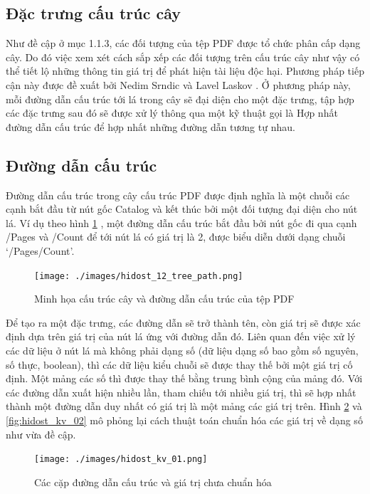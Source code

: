 \documentclass[./../main.tex]{subfiles}
\begin{document}
\subsection{Đặc trưng cấu trúc cây}
Như đề cập ở mục 1.1.3, các đối tượng của tệp PDF được tổ chức phân cấp dạng cây. Do đó việc xem xét cách sắp xếp các đối tượng trên cấu trúc cây như vậy có thể tiết lộ những thông tin giá trị để phát hiện tài liệu độc hại. Phương pháp tiếp cận này được đề xuất bởi Nedim Srndic và Lavel Laskov \cite{hidost}. Ở phương pháp này, mỗi đường dẫn cấu trúc tới lá trong cây sẽ đại diện cho một đặc trưng, tập hợp các đặc trưng sau đó sẽ được xử lý thông qua một kỹ thuật gọi là Hợp nhất đường dẫn cấu trúc để hợp nhất những đường dẫn tương tự nhau.

\subsection*{Đường dẫn cấu trúc}

Đường dẫn cấu trúc trong cây cấu trúc PDF được định nghĩa là một chuỗi các cạnh bắt đầu từ nút gốc Catalog và kết thúc bởi một đối tượng đại diện cho nút lá. Ví dụ theo hình \ref{fig:hidost_12_tree_path} , một đường dẫn cấu trúc bắt đầu bởi nút gốc đi qua cạnh /Pages và /Count để tới nút lá có giá trị là 2, được biểu diễn dưới dạng chuỗi ‘\slash Pages\slash Count’.

\begin{figure}[H]
	\centering
	\texttt{[image: ./images/hidost\_12\_tree\_path.png]}
	\caption{Minh họa cấu trúc cây và đường dẫn cấu trúc của tệp PDF \cite{hidost}}
	\label{fig:hidost_12_tree_path}
\end{figure}

Để tạo ra một đặc trưng, các đường dẫn sẽ trở thành tên, còn giá trị sẽ được xác định dựa trên giá trị của nút lá ứng với đường dẫn đó. Liên quan đến việc xử lý các dữ liệu ở nút lá mà không phải dạng số (dữ liệu dạng số bao gồm số nguyên, số thực, boolean), thì các dữ liệu kiểu chuỗi sẽ được thay thế bởi một giá trị cố định. Một mảng các số thì được thay thế bằng trung bình cộng của mảng đó. Với các đường dẫn xuất hiện nhiều lần, tham chiếu tới nhiều giá trị, thì sẽ hợp nhất thành một đường dẫn duy nhất có giá trị là một mảng các giá trị trên. Hình \ref{fig:hidost_kv_01} và \ref{fig:hidost_kv_02} mô phỏng lại cách thuật toán chuẩn hóa các giá trị về dạng số như vừa đề cập.

\begin{figure}[H]
	\centering
	\texttt{[image: ./images/hidost\_kv\_01.png]}
	\caption{Các cặp đường dẫn cấu trúc và giá trị chưa chuẩn hóa \cite{hidost}}
	\label{fig:hidost_kv_01}
\end{figure}
\end{document}
